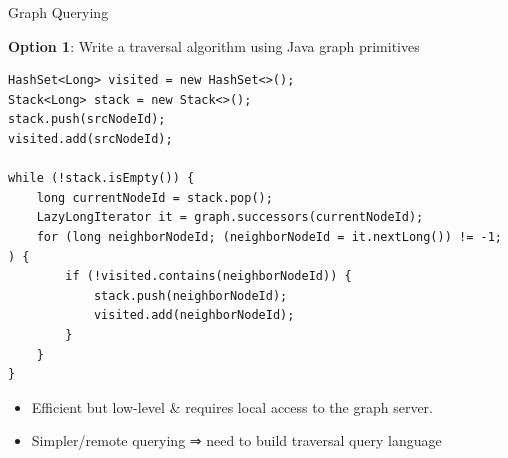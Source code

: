 \documentclass[aspectratio=169,xcolor=table]{beamer}
\begin{document}
    \begin{frame}[fragile]{Graph Querying}
        \begin{block}{}
            \textbf{Option 1}: Write a traversal algorithm using Java
            graph primitives
        \end{block}
        \begin{verbatim}
HashSet<Long> visited = new HashSet<>();
Stack<Long> stack = new Stack<>();
stack.push(srcNodeId);
visited.add(srcNodeId);

while (!stack.isEmpty()) {
    long currentNodeId = stack.pop();
    LazyLongIterator it = graph.successors(currentNodeId);
    for (long neighborNodeId; (neighborNodeId = it.nextLong()) != -1; ) {
        if (!visited.contains(neighborNodeId)) {
            stack.push(neighborNodeId);
            visited.add(neighborNodeId);
        }
    }
}
        \end{verbatim}
        \begin{block}{}
            \begin{itemize}
                \item Efficient but low-level \& requires local access to the
                    graph server.
                \item Simpler/remote querying ⇒ need to build traversal query
                    language
            \end{itemize}
        \end{block}
    \end{frame}
\end{document}
